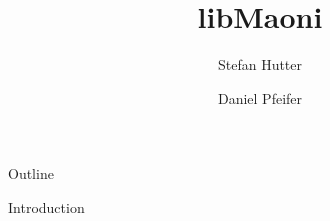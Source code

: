 \documentclass[paper=screen,orient=landscape,style=aggie]{powerdot}
\title{libMaoni}
\author{Stefan Hutter \and Daniel Pfeifer}
\begin{document}
\maketitle

\begin{slide}{Outline}
\end{slide}

\begin{slide}{Introduction}
\end{slide}
\end{document}
